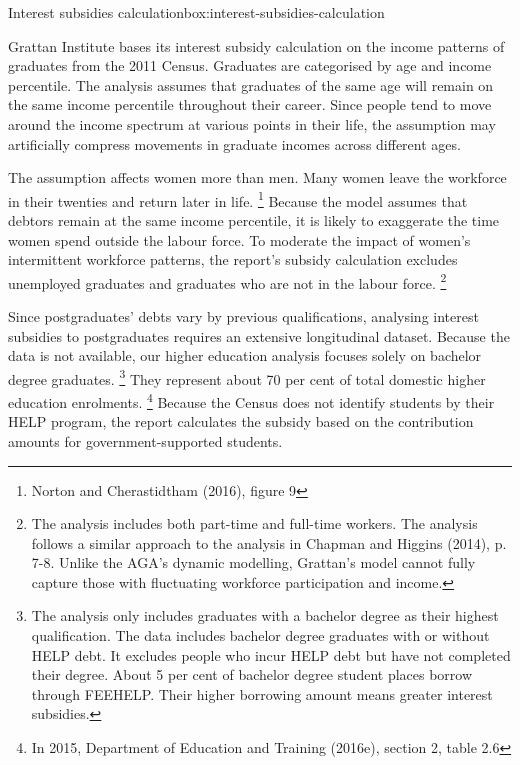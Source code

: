 \documentclass[embargoed]{grattan}
\begin{document}
\begin{bigbox*}{Interest subsidies calculation}{box:interest-subsidies-calculation}

Grattan Institute bases its interest subsidy calculation on the income patterns of graduates from the 2011 Census.
Graduates are categorised by age and income percentile.
The analysis assumes that graduates of the same age will remain on the same income percentile throughout their career.
Since people tend to move around the income spectrum at various points in their life, the assumption may artificially compress movements in graduate incomes across different ages.

The assumption affects women more than men.
Many women leave the workforce in their twenties and return later in life.%
\footnote{Norton and Cherastidtham (2016), figure 9} Because the model assumes that debtors remain at the same income percentile, it is likely to exaggerate the time women spend outside the labour force.
To moderate the impact of women's intermittent workforce patterns, the report's subsidy calculation excludes unemployed graduates and graduates who are not in the labour force.%
\footnote{The analysis includes both part-time and full-time workers.
The analysis follows a similar approach to the analysis in Chapman and Higgins (2014), p. 7-8.
Unlike the \gls{AGA}'s dynamic modelling, Grattan's model cannot fully capture those with fluctuating workforce participation and income.}

Since postgraduates' debts vary by previous qualifications, analysing interest subsidies to postgraduates requires an extensive longitudinal dataset.
Because the data is not available, our higher education analysis focuses solely on bachelor degree graduates.%
\footnote{The analysis only includes graduates with a bachelor degree as their highest qualification.
The data includes bachelor degree graduates with or without \gls{HELP} debt.
It excludes people who incur \gls{HELP} debt but have not completed their degree.
About 5 per cent of bachelor degree student places borrow through \gls{FEEHELP}.
Their higher borrowing amount means greater interest subsidies.} They represent about 70 per cent of total domestic higher education enrolments.%
\footnote{In 2015, Department of Education and Training (2016e), section 2, table 2.6} Because the Census does not identify students by their \gls{HELP} program, the report calculates the subsidy based on the contribution amounts for government-supported students.
\end{bigbox*}
\end{document}
